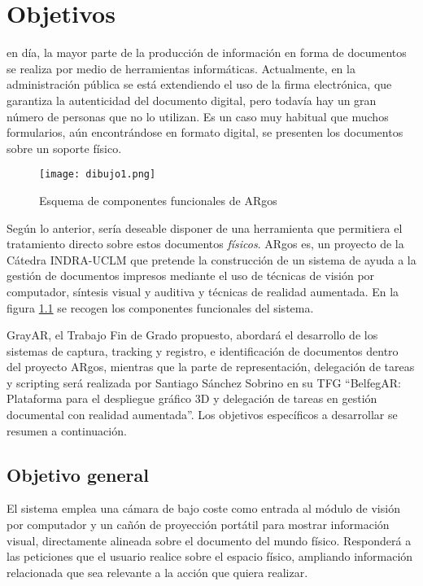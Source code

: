 \chapter{Objetivos}
\label{chap:objetivos}

 en día, la mayor parte de la producción de información en forma de documentos se realiza por medio de herramientas informáticas. Actualmente, en la administración pública se está extendiendo el uso de la firma electrónica, que garantiza la autenticidad del documento digital, pero todavía hay un gran número de personas que no lo utilizan. Es un caso muy habitual que muchos formularios, aún encontrándose en formato digital, se presenten los documentos sobre un soporte físico. %
\begin{figure}[h!]
  \begin{center}
      \texttt{[image: dibujo1.png]}
      \caption{Esquema de componentes funcionales de ARgos}
      \label{fig:diagrama_argos}
    \end{center}
\end{figure}
   
Según lo anterior, sería deseable disponer de una herramienta que permitiera el tratamiento directo sobre estos documentos \textit{físicos}.  ARgos es, un proyecto de la Cátedra INDRA-UCLM que pretende la construcción de un sistema de ayuda a la gestión de documentos impresos mediante el uso de técnicas de visión por computador, síntesis visual y auditiva y técnicas de realidad aumentada. En la figura \ref{fig:diagrama_argos} se recogen los componentes funcionales del sistema.


GrayAR, el Trabajo Fin de Grado propuesto, abordará el desarrollo de los sistemas de captura, tracking y registro, e identificación de documentos dentro del proyecto ARgos, mientras que la parte de representación, delegación de tareas y scripting será realizada por Santiago Sánchez Sobrino en su TFG ``BelfegAR: Plataforma para el despliegue gráfico 3D y delegación de tareas en gestión documental con realidad aumentada''. Los objetivos específicos a desarrollar se resumen a continuación.   

\section{Objetivo general}
El sistema emplea una cámara de bajo coste como entrada al módulo de visión por computador y un cañón de proyección portátil para mostrar información visual, directamente alineada sobre el documento del mundo físico. Responderá a las peticiones que el usuario realice sobre el espacio físico, ampliando información relacionada que sea relevante a la acción que quiera realizar.

